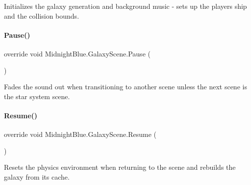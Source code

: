 Initializes the galaxy generation and background music -\/ sets up the players ship and the collision bounds. 

\hypertarget{class_midnight_blue_1_1_galaxy_scene_aeb44afaeda2cccd225e64908bb76bee4}{}\label{class_midnight_blue_1_1_galaxy_scene_aeb44afaeda2cccd225e64908bb76bee4} 
\paragraph{\texorpdfstring{Pause()}{Pause()}}
{\footnotesize\ttfamily override void Midnight\+Blue.\+Galaxy\+Scene.\+Pause (\begin{DoxyParamCaption}{ }\end{DoxyParamCaption})\hspace{0.3cm}{\ttfamily [inline]}}



Fades the sound out when transitioning to another scene unless the next scene is the star system scene. 

\hypertarget{class_midnight_blue_1_1_galaxy_scene_ab641e6727cdb64dc6487e9a229521692}{}\label{class_midnight_blue_1_1_galaxy_scene_ab641e6727cdb64dc6487e9a229521692} 
\paragraph{\texorpdfstring{Resume()}{Resume()}}
{\footnotesize\ttfamily override void Midnight\+Blue.\+Galaxy\+Scene.\+Resume (\begin{DoxyParamCaption}{ }\end{DoxyParamCaption})\hspace{0.3cm}{\ttfamily [inline]}}



Resets the physics environment when returning to the scene and rebuilds the galaxy from its cache. 

